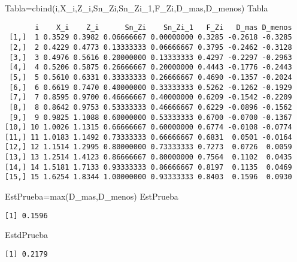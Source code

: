 \documentclass[
  a4paper,
  oneside,
  openany]{book}
\newenvironment{Shaded}{\begin{snugshade}}{\end{snugshade}}
\newcommand{\FunctionTok}[1]{\textcolor[rgb]{0.00,0.00,0.00}{#1}}
\newcommand{\NormalTok}[1]{#1}
\newcommand{\OtherTok}[1]{\textcolor[rgb]{0.56,0.35,0.01}{#1}}
\begin{document}
\begin{Shaded}
\begin{Highlighting}[]
\NormalTok{Tabla}\OtherTok{=}\FunctionTok{cbind}\NormalTok{(i,X\_i,Z\_i,Sn\_Zi,Sn\_Zi\_1,F\_Zi,D\_mas,D\_menos)                                                                                                                                                      }
\NormalTok{Tabla}
\end{Highlighting}
\end{Shaded}

\begin{verbatim}
       i    X_i    Z_i      Sn_Zi    Sn_Zi_1   F_Zi   D_mas D_menos
 [1,]  1 0.3529 0.3982 0.06666667 0.00000000 0.3285 -0.2618 -0.3285
 [2,]  2 0.4229 0.4773 0.13333333 0.06666667 0.3795 -0.2462 -0.3128
 [3,]  3 0.4976 0.5616 0.20000000 0.13333333 0.4297 -0.2297 -0.2963
 [4,]  4 0.5206 0.5875 0.26666667 0.20000000 0.4443 -0.1776 -0.2443
 [5,]  5 0.5610 0.6331 0.33333333 0.26666667 0.4690 -0.1357 -0.2024
 [6,]  6 0.6619 0.7470 0.40000000 0.33333333 0.5262 -0.1262 -0.1929
 [7,]  7 0.8595 0.9700 0.46666667 0.40000000 0.6209 -0.1542 -0.2209
 [8,]  8 0.8642 0.9753 0.53333333 0.46666667 0.6229 -0.0896 -0.1562
 [9,]  9 0.9825 1.1088 0.60000000 0.53333333 0.6700 -0.0700 -0.1367
[10,] 10 1.0026 1.1315 0.66666667 0.60000000 0.6774 -0.0108 -0.0774
[11,] 11 1.0183 1.1492 0.73333333 0.66666667 0.6831  0.0501 -0.0164
[12,] 12 1.1514 1.2995 0.80000000 0.73333333 0.7273  0.0726  0.0059
[13,] 13 1.2514 1.4123 0.86666667 0.80000000 0.7564  0.1102  0.0435
[14,] 14 1.5181 1.7133 0.93333333 0.86666667 0.8197  0.1135  0.0469
[15,] 15 1.6254 1.8344 1.00000000 0.93333333 0.8403  0.1596  0.0930
\end{verbatim}

\begin{Shaded}
\begin{Highlighting}[]
\NormalTok{EstPrueba}\OtherTok{=}\FunctionTok{max}\NormalTok{(D\_mas,D\_menos)}
\NormalTok{EstPrueba}
\end{Highlighting}
\end{Shaded}

\begin{verbatim}
[1] 0.1596
\end{verbatim}

\begin{Shaded}
\begin{Highlighting}[]
\NormalTok{EstdPrueba}
\end{Highlighting}
\end{Shaded}

\begin{verbatim}
[1] 0.2179
\end{verbatim}
\end{document}
